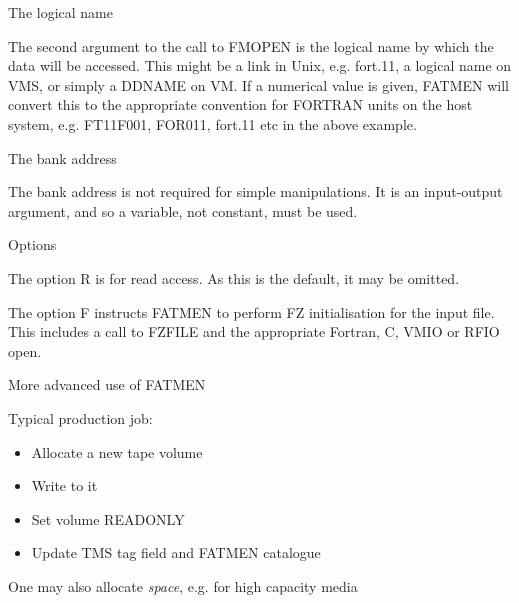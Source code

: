 \begin{slide}
\begin{center}The logical name\end{center}

The second argument to the call to FMOPEN is the logical name
by which the data will be accessed. This might be a link in Unix,
e.g. fort.11, a logical name on VMS, or simply a DDNAME on VM.
If a numerical value is given, FATMEN will convert this to the
appropriate convention for FORTRAN units on the host system,
e.g. FT11F001, FOR011, fort.11 etc in the above example.
\end{slide}
\begin{slide}

\begin{center}The bank address\end{center}

The bank address is not required for simple manipulations.
It is an input-output argument, and so a variable, not
constant, must be used.

\end{slide}
\begin{slide}

\begin{center}Options\end{center}

The option R is for read access. As this is the default,
it may be omitted.

The option F instructs FATMEN to perform FZ initialisation
for the input file. This includes a call to FZFILE and
the appropriate Fortran, C, VMIO or RFIO open.

\end{slide}

\begin{slide}
\begin{center}More advanced use of FATMEN\end{center}

Typical production job:
\begin{itemize}
\item
Allocate a new tape volume
\item
Write to it
\item
Set volume READONLY
\item
Update TMS tag field and FATMEN catalogue
\end{itemize}

One may also allocate {\it space}, e.g. for high capacity 
media
\end{slide}

